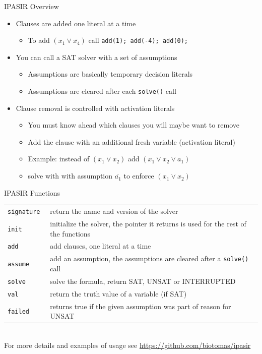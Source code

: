 \documentclass[t]{sdqbeamer}
\begin{document}
\begin{frame}{IPASIR Overview}
\begin{itemize}\setlength{\itemsep}{1em}
\item Clauses are added one literal at a time
\begin{itemize}\setlength{\itemsep}{1ex}
	\item To add $(x_1 \vee \overline{x_4})$ call \texttt{add(1); add(-4); add(0);}
\end{itemize}
\item You can call a SAT solver with a set of assumptions
\begin{itemize}\setlength{\itemsep}{1ex}
	\item Assumptions are basically temporary decision literals
	\item Assumptions are cleared after each \texttt{solve()} call
\end{itemize}
\item Clause removal is controlled with activation literals
\begin{itemize}\setlength{\itemsep}{1ex}
	\item You must know ahead which clauses you will maybe want to remove
	\item Add the clause with an additional fresh variable (activation literal)
	\item Example: instead of $(x_1 \vee x_2)$ add $(x_1 \vee x_2 \vee a_1)$
	\item solve with with assumption $\overline{a_1}$ to enforce $(x_1 \vee x_2)$
\end{itemize}
\end{itemize}
\end{frame}

\begin{frame}{IPASIR Functions}
	\def\arraystretch{1.5}
	\begin{tabularx}{\textwidth}{lX}
		\tt signature 	& return the name and version of the solver\\
		\tt init    	& initialize the solver, the pointer it returns is used for the rest of the functions\\
		\tt add 		& add clauses, one literal at a time\\
		\tt assume 		& add an assumption, the assumptions are cleared after a \texttt{solve()} call\\
		\tt solve 		& solve the formula, return SAT, UNSAT or INTERRUPTED\\
		\tt val 		& return the truth value of a variable (if SAT)\\
		\tt failed 		& returns true if the given assumption was part of reason for UNSAT\\
	\end{tabularx}~\\[1em]
	For more details and examples of usage see \url{https://github.com/biotomas/ipasir}
\end{frame}
\end{document}
